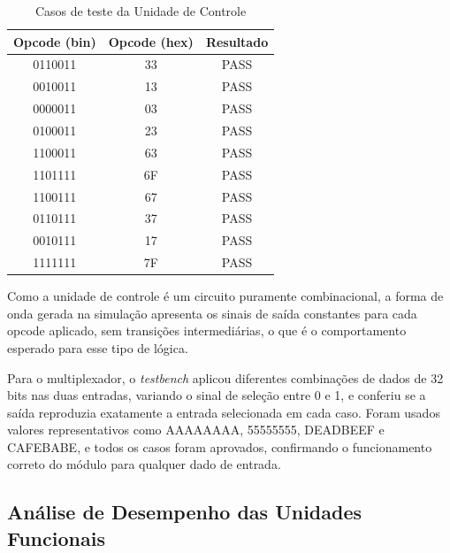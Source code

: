 \documentclass[conference]{IEEEtran}
\begin{document}
\begin{table}[!t]
\caption{Casos de teste da Unidade de Controle}
\begin{center}
\begin{tabular}{c|c|c}
\hline \hline
\textbf{Opcode (bin)} & \textbf{Opcode (hex)} & \textbf{Resultado} \\
\hline
0110011 & 33 & PASS \\
0010011 & 13 & PASS \\
0000011 & 03 & PASS \\
0100011 & 23 & PASS \\
1100011 & 63 & PASS \\
1101111 & 6F & PASS \\
1100111 & 67 & PASS \\
0110111 & 37 & PASS \\
0010111 & 17 & PASS \\
1111111 & 7F & PASS \\
\hline \hline
\end{tabular}
\end{center}
\label{tab:result_controle}
\end{table}

Como a unidade de controle é um circuito puramente combinacional, a forma de onda gerada na simulação
apresenta os sinais de saída constantes para cada opcode aplicado, sem transições intermediárias, o que é
o comportamento esperado para esse tipo de lógica.

Para o multiplexador, o \textit{testbench} aplicou diferentes combinações de dados de 32 bits nas duas
entradas, variando o sinal de seleção entre 0 e 1, e conferiu se a saída reproduzia exatamente a entrada
selecionada em cada caso. Foram usados valores representativos como AAAAAAAA, 55555555, DEADBEEF e
CAFEBABE, e todos os casos foram aprovados, confirmando o funcionamento correto do módulo para qualquer
dado de entrada.


\subsection{Análise de Desempenho das Unidades Funcionais}
\end{document}
